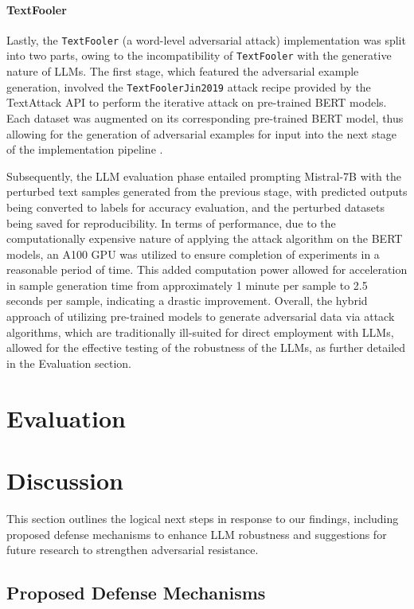 \documentclass[conference]{IEEEtran}
\begin{document}
\paragraph{TextFooler}
Lastly, the \texttt{TextFooler} (a word-level adversarial attack) implementation was split into two parts, owing to the incompatibility of \texttt{TextFooler} with the generative nature of LLMs. The first stage, which featured the adversarial example generation, involved the \texttt{TextFoolerJin2019} attack recipe provided by the TextAttack API \cite{textattack2020framework} to perform the iterative attack on pre-trained BERT models. Each dataset was augmented on its corresponding pre-trained BERT model, thus allowing for the generation of adversarial examples for input into the next stage of the implementation pipeline \cite{jin2020bertrobust}.

Subsequently, the LLM evaluation phase entailed prompting Mistral-7B with the perturbed text samples generated from the previous stage, with predicted outputs being converted to labels for accuracy evaluation, and the perturbed datasets being saved for reproducibility. In terms of performance, due to the computationally expensive nature of applying the attack algorithm on the BERT models, an A100 GPU was utilized to ensure completion of experiments in a reasonable period of time. This added computation power allowed for acceleration in sample generation time from approximately 1 minute per sample to 2.5 seconds per sample, indicating a drastic improvement. Overall, the hybrid approach of utilizing pre-trained models to generate adversarial data via attack algorithms, which are traditionally ill-suited for direct employment with LLMs, allowed for the effective testing of the robustness of the LLMs, as further detailed in the Evaluation section.

\section{Evaluation}

\section{Discussion}

This section outlines the logical next steps in response to our findings, including proposed defense mechanisms to enhance LLM robustness and suggestions for future research to strengthen adversarial resistance.

\subsection{Proposed Defense Mechanisms}
\end{document}
